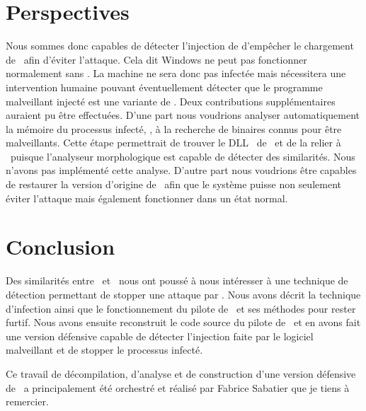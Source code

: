 \section{Perspectives}
Nous sommes donc capables de détecter l'injection de d'empêcher le chargement de \services\ afin d'éviter l'attaque.
Cela dit Windows ne peut pas fonctionner normalement sans \services. La machine ne sera donc pas infectée mais nécessitera une intervention humaine pouvant éventuellement détecter que le programme malveillant injecté est une variante de \stux.
Deux contributions supplémentaires auraient pu être effectuées. D'une part nous voudrions analyser automatiquement la mémoire du processus infecté, \services, à la recherche de binaires connus pour être malveillants. 
Cette étape permettrait de trouver le DLL \netpDLL\ de \duqu\ et de la relier à \stux\ puisque l'analyseur morphologique est capable de détecter des similarités. Nous n'avons pas implémenté cette analyse.
D'autre part nous voudrions être capables de restaurer la version d'origine de \services\ afin que le système puisse non seulement éviter l'attaque mais également fonctionner dans un état normal.

\section*{Conclusion}
Des similarités entre \duqu\ et \stux\ nous ont poussé à nous intéresser à une technique de détection permettant de stopper une attaque par \duqu.
Nous avons décrit la technique d'infection ainsi que le fonctionnement du pilote de \duqu\ et ses méthodes pour rester furtif.
Nous avons ensuite reconstruit le code source du pilote de \duqu\ et en avons fait une version défensive capable de détecter l'injection faite par le logiciel malveillant et de stopper le processus infecté.

Ce travail de décompilation, d'analyse et de construction d'une version défensive de \duqu\ a principalement été orchestré et réalisé par Fabrice Sabatier que je tiens à remercier.
